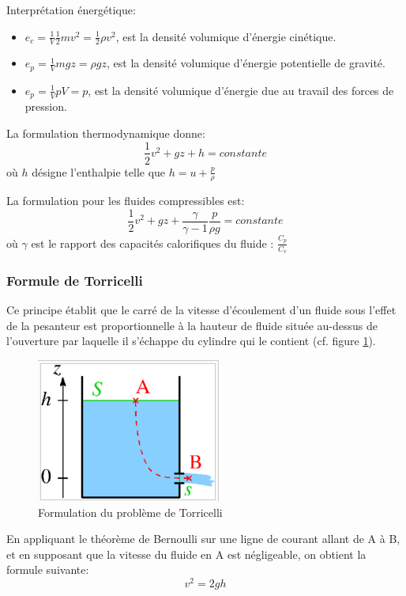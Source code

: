 \documentclass[10pt,a4paper]{article}
\begin{document}
Interprétation énergétique:
\begin{itemize}
\item $e_{c} = \frac{1}{V}\frac{1}{2}mv^{2} = \frac{1}{2}\rho v^{2}$, est la densité volumique d'énergie cinétique.
\item $e_{p} = \frac{1}{V}mgz = \rho gz$, est la densité volumique d'énergie potentielle de gravité.
\item $e_{p} = \frac{1}{V} pV = p$, est la densité volumique d'énergie due au travail des forces de pression.
\end{itemize}

La formulation thermodynamique donne:
\begin{equation}
\frac{1}{2}v^{2} + gz + h = constante
\end{equation}
où $h$ désigne l'enthalpie telle que $h = u + \frac{p}{\rho}$

La formulation pour les fluides compressibles est:
\begin{equation}
\frac{1}{2}v^{2} + gz + \frac{\gamma}{\gamma - 1}\frac{p}{\rho g} = constante
\end{equation}
où $\gamma$ est le rapport des capacités calorifiques du fluide : $\frac{C_{p}}{C_{v}}$

\subsubsection{Formule de Torricelli\cite{torricelli}}
Ce principe établit que le carré de la vitesse d'écoulement d'un fluide sous l'effet de la pesanteur est proportionnelle à la hauteur de fluide située au-dessus de l'ouverture par laquelle il s'échappe du cylindre qui le contient (cf. figure \ref{fig:torricelli}).
\begin{figure}
\centering
\includegraphics[scale=0.5]{torricelli}
\caption{Formulation du problème de Torricelli}
\label{fig:torricelli}
\end{figure}
En appliquant le théorème de Bernoulli sur une ligne de courant allant de A à B, et en supposant que la vitesse du fluide en A est négligeable, on obtient la formule suivante:
\begin{equation}
v^{2} = 2gh
\end{equation}
\end{document}
